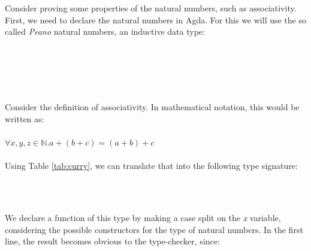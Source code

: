\documentclass[12pt,twoside,notitlepage]{report}
\begin{document}
Consider proving some properties of the natural numbers, such as associativity. First, we need to declare the natural numbers in Agda. For this we will use the so called \textit{Peano} natural numbers, an inductive data type:
\begin{code}%
\\
\>  \AgdaSymbol{:}  \<%
\\
\>[0]\<[2]%
\>[2] \AgdaSymbol{:} \<%
\\
\>[0]\<[2]%
\>[2] \<[7]%
\>[7]\AgdaSymbol{:}   \<%
\\
\end{code} 
Consider the definition of associativity. In mathematical notation, this would be written as:\\\\
\indent $\forall x, y, z \in \mathbb{N}. a + (b + c) = (a + b) + c$ \\
\\
Using Table \ref{tab:curry}, we can translate that into the following type signature: 
\begin{code}
\\
\>[0]\<[2]%
\>[2] \AgdaSymbol{:} \AgdaSymbol{(}   \AgdaSymbol{:} \AgdaSymbol{)}  \AgdaSymbol{(} \AgdaPrimitive{+} \AgdaSymbol{(} \AgdaPrimitive{+} \AgdaSymbol{))}  \AgdaSymbol{((} \AgdaPrimitive{+} \AgdaSymbol{)} \AgdaPrimitive{+} \AgdaSymbol{)}\<%
\\
\end{code}
We declare a function of this type by making a case split on the \textit{x} variable, considering the possible constructors for the type of natural numbers. In the first line, the result becomes obvious to the type-checker, since:\\ 
\indent \AgdaSymbol{(}  \AgdaPrimitive{+} \AgdaSymbol{(} \AgdaPrimitive{+} \AgdaSymbol{))} \AgdaDatatype{=}   \AgdaPrimitive{+}  \AgdaDatatype{=}\AgdaSymbol{((} \AgdaPrimitive{+} \AgdaSymbol{)} \AgdaPrimitive{+} \AgdaSymbol{)}\\\\
\end{document}
